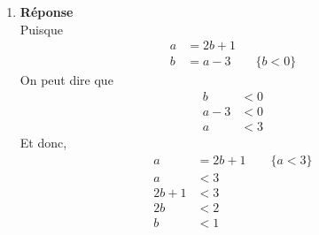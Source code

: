 \documentclass[12pt]{book}
\begin{document}
\begin{enumerate}
    \item \textbf{Réponse}\\
    
        Puisque
        \begin{align*}
            a &= 2b + 1\\
            b &= a - 3 \qquad \{b < 0\}
        \end{align*}
        On peut dire que
        \begin{align*}
            b &< 0\\
            a - 3 &< 0\\
            a &< 3
        \end{align*}
        Et donc,
        \begin{align*}
            a &= 2b + 1 \qquad \{a < 3\}\\
            a &< 3\\
            2b + 1 &< 3\\
            2b &< 2\\
            b &< 1
        \end{align*}


\end{enumerate}
\end{document}
